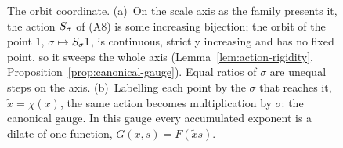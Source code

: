 \begin{figure}[t]
\begin{tikzpicture}[every node/.style={font=\small}, line cap=round, >=stealth]
\end{tikzpicture}
\caption{The orbit coordinate. (a)~On the scale axis as the family presents it, the action
$S_\sigma$ of (A8) is some increasing bijection; the orbit of the point $1$,
$\sigma \mapsto S_\sigma 1$, is continuous, strictly increasing and has no fixed point, so
it sweeps the whole axis (Lemma~\ref{lem:action-rigidity},
Proposition~\ref{prop:canonical-gauge}). Equal ratios of $\sigma$ are unequal steps on the
axis. (b)~Labelling each point by the $\sigma$ that reaches it, $\tilde x = \chi(x)$, the same
action becomes multiplication by $\sigma$: the canonical gauge. In this gauge every accumulated exponent is a dilate of one function, $G(x,s) = F(\tilde x s)$.}
\label{fig:orbit-gauge}
\end{figure}
